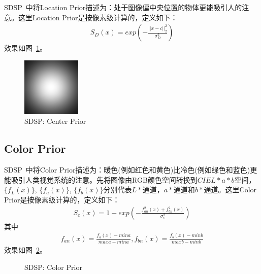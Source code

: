 \documentclass[12pt]{article}
\begin{document}
SDSP~\cite{zhang2013sdsp}中将Location Prior描述为：处于图像偏中央位置的物体更能吸引人的注意。这里Location Prior是按像素级计算的，定义如下：
\begin{align}
S_D(x) = exp\left(-\frac{||x-c||_2^2}{\sigma_D^2}\right)
\end{align}
效果如图~\ref{fig: SDSPCenterPrior}。
\begin{figure}[!ht]
\centering
\includegraphics[width=0.25\textwidth]{SDSPCenterPrior.png}
\caption{SDSP: Center Prior}
\label{fig: SDSPCenterPrior}
\end{figure} 

\subsection{Color Prior}

SDSP~\cite{zhang2013sdsp}中将Color Prior描述为：暖色(例如红色和黄色)比冷色(例如绿色和蓝色)更能吸引人类视觉系统的注意。先将图像由RGB颜色空间转换到$CIEL*a*b$空间，$\{ f_L(x)\}$, $\{ f_a(x)\}$, $\{ f_b(x)\}$分别代表$L*$通道，$a*$通道和$b*$通道。这里Color Prior是按像素级计算的，定义如下：
\begin{align}
S_c(x) = 1-exp\left(-\frac{f_{an}^2(x)+f_{bn}^2(x)}{\sigma_c^2}\right)
\end{align}
其中
\begin{align}
f_{an}(x)=\frac{f_a(x)-mina}{maxa-mina}, f_{bn}(x) = \frac{f_b(x)-minb}{maxb-minb}
\end{align}
效果如图~\ref{fig: SDSPColorPrior}。
\begin{figure}
  \centering 
  \caption{SDSP: Color Prior}
  \label{fig: SDSPColorPrior} %
\end{figure}

%


\end{document}
